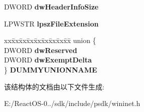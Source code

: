 \begin{DoxyCompactItemize}
D\+W\+O\+RD {\bfseries dw\+Header\+Info\+Size}
\item 
\mbox{\label{struct___i_n_t_e_r_n_e_t___c_a_c_h_e___e_n_t_r_y___i_n_f_o_w_aa1a3d79032a955aca7e8cd78f4a4b56d}} 
L\+P\+W\+S\+TR {\bfseries lpsz\+File\+Extension}
\item 
\mbox{\label{struct___i_n_t_e_r_n_e_t___c_a_c_h_e___e_n_t_r_y___i_n_f_o_w_a5022159d054fa19ff96cf22c8e866712}} 
\begin{tabbing}
xx\=xx\=xx\=xx\=xx\=xx\=xx\=xx\=xx\=\kill
union \{\\
\>DWORD {\bfseries dwReserved}\\
\>DWORD {\bfseries dwExemptDelta}\\
\} {\bfseries DUMMYUNIONNAME}\\

\end{tabbing}\end{DoxyCompactItemize}


该结构体的文档由以下文件生成\+:\begin{DoxyCompactItemize}
\item 
E\+:/\+React\+O\+S-\/0../sdk/include/psdk/wininet.\+h\end{DoxyCompactItemize}
